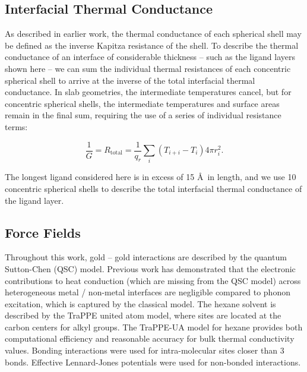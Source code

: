 \documentclass[aps,jcp,preprint,showpacs,superscriptaddress,groupedaddress]{revtex4-1}  %
\begin{document}
\subsection{Interfacial Thermal Conductance}

As described in earlier work,\cite{Stocker:2014qq} the thermal
conductance of each spherical shell may be defined as the inverse
Kapitza resistance of the shell. To describe the thermal conductance
of an interface of considerable thickness -- such as the ligand layers
shown here -- we can sum the individual thermal resistances of each
concentric spherical shell to arrive at the inverse of the total
interfacial thermal conductance. In slab geometries, the intermediate
temperatures cancel, but for concentric spherical shells, the
intermediate temperatures and surface areas remain in the final sum,
requiring the use of a series of individual resistance terms:

\begin{equation}
  \frac{1}{G} = R_\mathrm{total} = \frac{1}{q_r} \sum_i \left(T_{i+i} -
    T_i\right) 4 \pi r_i^2.
\end{equation}

The longest ligand considered here is in excess of 15 \AA\ in length,
and we use 10 concentric spherical shells to describe the total
interfacial thermal conductance of the ligand layer.

\subsection{Force Fields}

Throughout this work, gold -- gold interactions are described by the
quantum Sutton-Chen (QSC) model.\cite{Qi:1999ph} Previous
work\cite{Kuang:2011ef} has demonstrated that the electronic
contributions to heat conduction (which are missing from the QSC
model) across heterogeneous metal / non-metal interfaces are
negligible compared to phonon excitation, which is captured by the
classical model. The hexane solvent is described by the TraPPE united
atom model,\cite{TraPPE-UA.alkanes} where sites are located at the
carbon centers for alkyl groups. The TraPPE-UA model for hexane
provides both computational efficiency and reasonable accuracy for
bulk thermal conductivity values. Bonding interactions were used for
intra-molecular sites closer than 3 bonds. Effective Lennard-Jones
potentials were used for non-bonded interactions.
\end{document}
